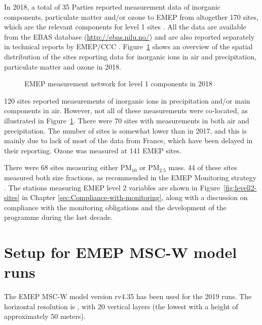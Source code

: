 In 2018, a total of 35 Parties reported measurement data of inorganic components, particulate matter and/or ozone to EMEP from altogether 170 sites, which are the relevant components for level 1 sites \citep{MonStrat2019}. 
All the data are available from the EBAS database (\url{http://ebas.nilu.no/}) and are also reported separately in technical reports by EMEP/CCC \citep{Hjellbrekke2020a,Hjellbrekke2020b}. Figure~\ref{fig:EMEP-measurement-network} shows an overview of the spatial distribution of the sites reporting data for inorganic ions in air and precipitation, particulate matter and ozone in 2018.

\begin{figure}[h!]
 \centering
\caption{\label{fig:EMEP-measurement-network}EMEP measurement network for level 1 components in 2018}
\end{figure}

120 sites reported measurements of inorganic ions in precipitation and/or main components in air. However, not all of these measurements were co-located, as illustrated in Figure~\ref{fig:EMEP-measurement-network}. There were 70 sites with measurements in both air and precipitation. The number of sites is somewhat lower than in 2017, and this is mainly due to lack of most of the data from France, which have been delayed in their reporting. Ozone was measured at 141 EMEP sites.

There were 68 sites measuring either PM$_{10}$ or PM$_{2.5}$ mass. 44 of these sites measured both size fractions, as recommended in the EMEP Monitoring strategy \citep{MonStrat2019}. The stations measuring EMEP level 2 variables are shown in Figure~\ref{fig:levell2-sites} in Chapter \ref{sec:Compliance-with-monitoring}, along with a discussion on compliance with the monitoring obligations and the development of the programme during the last decade.

\section{Setup for EMEP MSC-W model runs}
\label{Mod_2019}

The EMEP MSC-W model version rv4.35 has been used for the 2019
runs. The horizontal resolution is \resZO, with 20 vertical layers
(the lowest with a height of approximately 50 meters).

